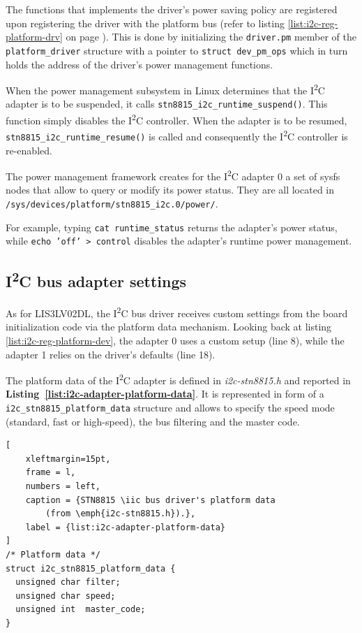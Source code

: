 \documentclass[a4paper,10pt]{article}
\newcommand{\iic}{I\textsuperscript{2}C }
\newcommand{\keyword}[1]{\texttt{#1}}
\newcommand{\refl}[1]{\textbf{Listing~\ref{#1}}}
\begin{document}
\begin{multicols}{2}
The functions that implements the driver's power saving policy are registered
upon registering the driver with the platform bus (refer to listing
\ref{list:i2c-reg-platform-drv} on page \pageref{list:i2c-reg-platform-drv}).
This is done by initializing the \keyword{driver.pm} member of the
\keyword{platform\_driver} structure with a pointer to
\keyword{struct dev\_pm\_ops} which in turn holds the address of the driver's
power management functions.

When the power management subsystem in Linux determines that the \iic adapter
is to be suspended, it calls \keyword{stn8815\_i2c\_runtime\_suspend()}.
This function simply disables the \iic controller.  
When the adapter is to be resumed, \keyword{stn8815\_i2c\_runtime\_resume()} is 
called and consequently the \iic controller is re-enabled.

The power management framework creates for the \iic adapter 0 a set of sysfs
nodes that allow to query or modify its power status. They are all located in 
\keyword{/sys/devices/platform/stn8815\_i2c.0/power/}.

For example, typing \keyword{cat runtime\_status} returns the adapter's power
status, while \keyword{echo 'off' > control} disables the adapter's
runtime power management.


\subsection{\iic bus adapter settings}
\label{sec:adapter_settings}

As for LIS3LV02DL, the \iic bus driver receives custom settings from the board
initialization code via the platform data mechanism.
Looking back at listing \ref{list:i2c-reg-platform-dev}, the adapter 0 uses a
custom setup (line 8), while the adapter 1 relies on the driver's defaults
(line 18).

The platform data of the \iic adapter is defined in \emph{i2c-stn8815.h} and
reported in \refl{list:i2c-adapter-platform-data}.
It is represented in form of a \keyword{i2c\_stn8815\_platform\_data} structure
and allows to specify the speed mode (standard, fast or high-speed), 
the bus filtering and the master code.

\begin{lstlisting}[
	xleftmargin=15pt,
	frame = l,
	numbers = left,
	caption = {STN8815 \iic bus driver's platform data
		(from \emph{i2c-stn8815.h}).},
	label = {list:i2c-adapter-platform-data}
]
/* Platform data */
struct i2c_stn8815_platform_data {
  unsigned char filter;
  unsigned char speed;
  unsigned int  master_code;
}
\end{lstlisting}


\end{multicols}
\end{document}
